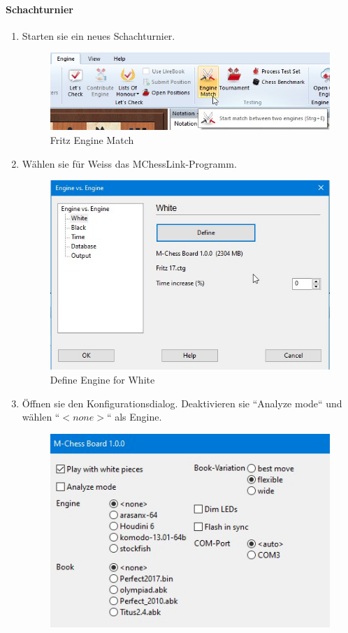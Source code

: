 \documentclass[11pt,a4paper]{article}
\begin{document}
\paragraph{Schachturnier}
\begin{enumerate}
	\item Starten sie ein neues Schachturnier.
	\begin{figure}[H]
		\centering
		\includegraphics[scale=0.6]{fritz_enginematch.jpg}
		\caption{Fritz Engine Match}
		\label{fig:FritzEngineMatch}
	\end{figure}
	\item Wählen sie für Weiss das MChessLink-Programm.
		\begin{figure}[H]
		\centering
		\includegraphics[scale=0.7]{fritz_enginewhite.jpg}
		\caption{Define Engine for White}
		\label{fig:FritzEngineWhite}
	\end{figure}
	\item Öffnen sie den Konfigurationsdialog. Deaktivieren sie ``Analyze mode`` und wählen ``\begin{math}<none>\end{math}`` als Engine.
			\begin{figure}[H]
		\centering
		\includegraphics[scale=0.8]{fritz_engine_configure_mchesslink.jpg}

\end{figure}
\end{enumerate}
\end{document}
